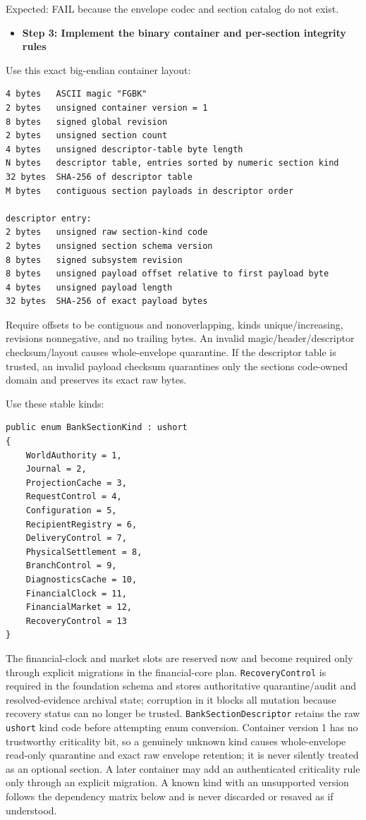 \documentclass[
  10pt,
  letterpaper,
]{article}
\newcommand{\passthrough}[1]{#1}
\providecommand{\tightlist}{%
  \setlength{\itemsep}{0pt}\setlength{\parskip}{0pt}}
\begin{document}
Expected: FAIL because the envelope codec and section catalog do not
exist.

\begin{itemize}
\tightlist
\item[$\square$]
  \textbf{Step 3: Implement the binary container and per-section
  integrity rules}
\end{itemize}

Use this exact big-endian container layout:

\begin{lstlisting}
4 bytes   ASCII magic "FGBK"
2 bytes   unsigned container version = 1
8 bytes   signed global revision
2 bytes   unsigned section count
4 bytes   unsigned descriptor-table byte length
N bytes   descriptor table, entries sorted by numeric section kind
32 bytes  SHA-256 of descriptor table
M bytes   contiguous section payloads in descriptor order

descriptor entry:
2 bytes   unsigned raw section-kind code
2 bytes   unsigned section schema version
8 bytes   signed subsystem revision
8 bytes   unsigned payload offset relative to first payload byte
4 bytes   unsigned payload length
32 bytes  SHA-256 of exact payload bytes
\end{lstlisting}

Require offsets to be contiguous and nonoverlapping, kinds
unique/increasing, revisions nonnegative, and no trailing bytes. An
invalid magic/\allowbreak{}header/\allowbreak{}descriptor
checksum/layout causes whole-envelope quarantine. If the descriptor
table is trusted, an invalid payload checksum quarantines only the
section\textquotesingle s code-owned domain and preserves its exact raw
bytes.

Use these stable kinds:

\begin{lstlisting}
public enum BankSectionKind : ushort
{
    WorldAuthority = 1,
    Journal = 2,
    ProjectionCache = 3,
    RequestControl = 4,
    Configuration = 5,
    RecipientRegistry = 6,
    DeliveryControl = 7,
    PhysicalSettlement = 8,
    BranchControl = 9,
    DiagnosticsCache = 10,
    FinancialClock = 11,
    FinancialMarket = 12,
    RecoveryControl = 13
}
\end{lstlisting}

The financial-clock and market slots are reserved now and become
required only through explicit migrations in the financial-core plan.
\passthrough{\lstinline!RecoveryControl!} is required in the foundation
schema and stores authoritative quarantine/audit and resolved-evidence
archival state; corruption in it blocks all mutation because recovery
status can no longer be trusted.
\passthrough{\lstinline!BankSectionDescriptor!} retains the raw
\passthrough{\lstinline!ushort!} kind code before attempting enum
conversion. Container version 1 has no trustworthy criticality bit, so a
genuinely unknown kind causes whole-envelope read-only quarantine and
exact raw envelope retention; it is never silently treated as an
optional section. A later container may add an authenticated criticality
rule only through an explicit migration. A known kind with an
unsupported version follows the dependency matrix below and is never
discarded or resaved as if understood.
\end{document}
